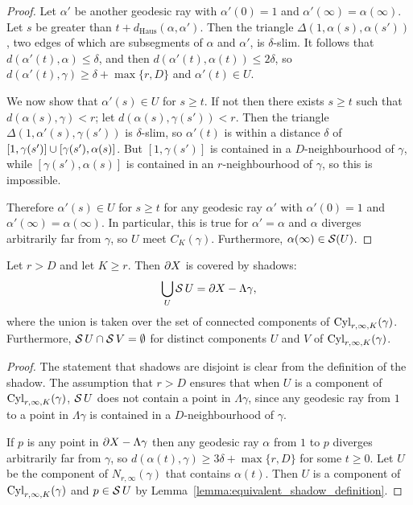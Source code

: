 \begin{proof}
  Let $\alpha'$ be another geodesic ray with $\alpha'(0) = 1$ and $\alpha'(\infty) = \alpha(\infty)$.
  Let $s$ be greater than $t + d_\mathrm{Haus}(\alpha,\alpha')$. 
  Then the triangle $\Delta(1, \alpha(s), \alpha(s'))$, two edges of which are subsegments of $\alpha$ and $\alpha'$, is $\delta$-slim. 
  It follows that $d(\alpha'(t), \alpha) \leq \delta$, and then $d(\alpha'(t), \alpha(t)) \leq 2\delta$, so $d(\alpha'(t), \gamma) \geq \delta + \max\{r, D\}$ and $\alpha'(t) \in U$.

  We now show that $\alpha'(s) \in U$ for $s \geq t$.
  If not then there exists $s \geq t$ such that $d(\alpha(s), \gamma) < r$; let $d(\alpha(s), \gamma(s')) < r$.
  Then the triangle $\Delta(1, \alpha'(s), \gamma(s'))$ is $\delta$-slim, so $\alpha'(t)$ is within a distance $\delta$ of $[1, \gamma(s')] \cup [\gamma(s'), \alpha(s)]$.
  But $[1, \gamma(s')]$ is contained in a $D$-neighbourhood of $\gamma$, while $[\gamma(s'), \alpha(s)]$ is contained in an $r$-neighbourhood of $\gamma$, so this is impossible.

  Therefore $\alpha'(s) \in U$ for $s \geq t$ for any geodesic ray $\alpha'$ with $\alpha'(0) = 1$ and $\alpha'(\infty) = \alpha(\infty)$.
  In particular, this is true for $\alpha' = \alpha$ and $\alpha$ diverges arbitrarily far from $\gamma$, so $U$ meet $C_K(\gamma)$.
  Furthermore, $\alpha(\infty) \in \operatorname{\mathcal{S}}(U)$.
\end{proof}

\begin{lemma}\label{lemma:disjoint_cover_by_shadows} Let $r > D$ and let $K \geq r$. Then $\partial X$ is covered by shadows:
  \begin{align}
    \bigcup_U\operatorname{\mathcal{S}} U = \partial X - \Lambda\gamma,
  \end{align}
  where the union is taken over the set of connected components of\/ $\operatorname{Cyl}_{r, \infty, K}(\gamma)$. 
  Furthermore, $\operatorname{\mathcal{S}} U \cap \operatorname{\mathcal{S}} V = \emptyset$ for distinct components $U$ and $V$ of\/ $\operatorname{Cyl}_{r, \infty, K}(\gamma)$.
\end{lemma}

\begin{proof} 
  The statement that shadows are disjoint is clear from the definition of the shadow. 
  The assumption that $r > D$ ensures that when $U$ is a component of $\operatorname{Cyl}_{r, \infty, K}(\gamma)$, $\operatorname{\mathcal{S}} U$ does not contain a point in $\Lambda\gamma$, since any geodesic ray from $1$ to a point in $\Lambda\gamma$ is contained in a $D$-neighbourhood of $\gamma$.

  If $p$ is any point in $\partial X - \Lambda\gamma$ then any geodesic ray $\alpha$ from $1$ to $p$ diverges arbitrarily far from $\gamma$, so $d(\alpha(t), \gamma) \geq 3\delta + \max\{r, D\}$ for some $t \geq 0$. 
  Let $U$ be the component of $N_{r, \infty}(\gamma)$ that contains $\alpha(t)$.
  Then $U$ is a component of $\operatorname{Cyl}_{r, \infty, K}(\gamma)$ and $p \in \operatorname{\mathcal{S}} U$ by Lemma~\ref{lemma:equivalent_shadow_definition}.
\end{proof}


